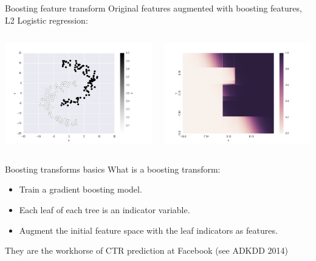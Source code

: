 \documentclass[11pt]{beamer}
\begin{document}
\begin{frame}{Boosting feature transform}
Original features augmented with boosting features, L2 Logistic regression:
\begin{columns}
\includegraphics[scale=0.3]{arcs_boosting.png} 

\includegraphics[scale=0.3]{arcs_boosting_hm.png} 
\end{columns}
\end{frame}

\begin{frame}{Boosting transforms basics}
What is a boosting transform:
\begin{itemize}
\item Train a gradient boosting model.
\item Each leaf of each tree is an indicator variable.
\item Augment the initial feature space with the leaf indicators as features.
\end{itemize}
They are the workhorse of CTR prediction at Facebook (see ADKDD 2014)
\end{frame}
\end{document}

